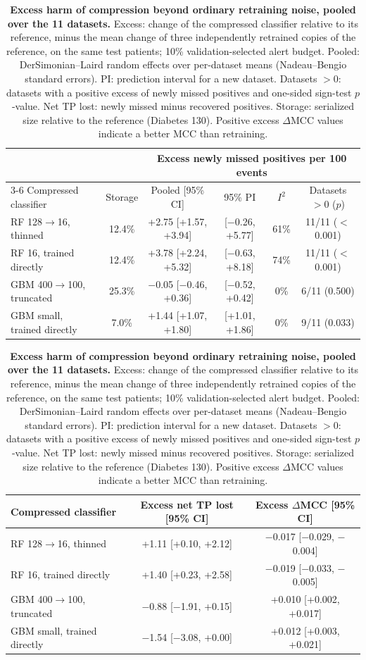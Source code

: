 \begin{table}[!htb]
\centering
\caption{\textbf{Excess harm of compression beyond ordinary retraining noise, pooled over the 11 datasets.} Excess: change of the compressed classifier relative to its reference, minus the mean change of three independently retrained copies of the reference, on the same test patients; 10\% validation-selected alert budget. Pooled: DerSimonian--Laird random effects over per-dataset means (Nadeau--Bengio standard errors). PI: prediction interval for a new dataset. Datasets $>0$: datasets with a positive excess of newly missed positives and one-sided sign-test $p$-value. Net TP lost: newly missed minus recovered positives. Storage: serialized size relative to the reference (Diabetes 130). Positive excess $\Delta$MCC values indicate a better MCC than retraining.}
\label{tab:META}
{\small
\begin{tabular}{lccccc}
\toprule
 & & \multicolumn{4}{c}{Excess newly missed positives per 100 events} \\
\cmidrule(l){3-6}
Compressed classifier & Storage & Pooled [95\% CI] & 95\% PI & $I^2$ & Datasets $>0$ ($p$) \\
\midrule
RF 128$\rightarrow$16, thinned & 12.4\% & +2.75 [+1.57, +3.94] & [$-$0.26, +5.77] & 61\% & 11/11 ($<$0.001) \\
RF 16, trained directly & 12.4\% & +3.78 [+2.24, +5.32] & [$-$0.63, +8.18] & 74\% & 11/11 ($<$0.001) \\
GBM 400$\rightarrow$100, truncated & 25.3\% & $-$0.05 [$-$0.46, +0.36] & [$-$0.52, +0.42] & 0\% & 6/11 (0.500) \\
GBM small, trained directly & 7.0\% & +1.44 [+1.07, +1.80] & [+1.01, +1.86] & 0\% & 9/11 (0.033) \\
\bottomrule
\end{tabular}
\par\vspace{1.2em}
\begin{tabular}{lcc}
\toprule
Compressed classifier & Excess net TP lost [95\% CI] & Excess $\Delta$MCC [95\% CI] \\
\midrule
RF 128$\rightarrow$16, thinned & +1.11 [+0.10, +2.12] & $-$0.017 [$-$0.029, $-$0.004] \\
RF 16, trained directly & +1.40 [+0.23, +2.58] & $-$0.019 [$-$0.033, $-$0.005] \\
GBM 400$\rightarrow$100, truncated & $-$0.88 [$-$1.91, +0.15] & +0.010 [+0.002, +0.017] \\
GBM small, trained directly & $-$1.54 [$-$3.08, +0.00] & +0.012 [+0.003, +0.021] \\
\bottomrule
\end{tabular}
}
\end{table}
